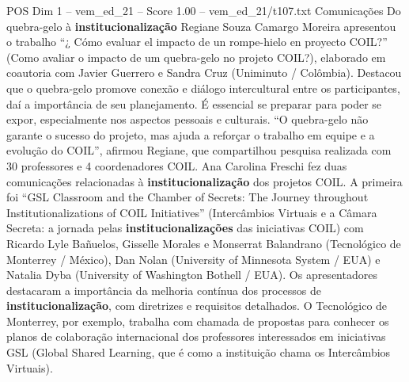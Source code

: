 \begin{textsample}{POS Dim 1 – vem\_ed\_21 – Score 1.00 – vem\_ed\_21/t107.txt}  \label{ex:f1_pos_037}
Comunicações Do quebra-gelo à \textbf{institucionalização} Regiane Souza Camargo Moreira apresentou o trabalho “¿ Cómo evaluar el impacto de un rompe-hielo en proyecto COIL?” (Como avaliar o impacto de um quebra-gelo no projeto COIL?), elaborado em coautoria com Javier Guerrero e Sandra Cruz (Uniminuto / Colômbia).
Destacou que o quebra-gelo promove conexão e diálogo intercultural entre os participantes, daí a importância de seu planejamento.
É essencial se preparar para poder se expor, especialmente nos aspectos pessoais e culturais. “O quebra-gelo não garante o sucesso do projeto, mas ajuda a reforçar o trabalho em equipe e a evolução do COIL”, afirmou Regiane, que compartilhou pesquisa realizada com 30 professores e 4 coordenadores COIL.
Ana Carolina Freschi fez duas comunicações relacionadas à \textbf{institucionalização} dos projetos COIL.
A primeira foi “GSL Classroom and the Chamber of Secrets: The Journey throughout Institutionalizations of COIL Initiatives” (Intercâmbios Virtuais e a Câmara Secreta: a jornada pelas \textbf{institucionalizações} das iniciativas COIL) com Ricardo Lyle Bañuelos, Gisselle Morales e Monserrat Balandrano (Tecnológico de Monterrey / México), Dan Nolan (University of Minnesota System / EUA) e Natalia Dyba (University of Washington Bothell / EUA).
Os apresentadores destacaram a importância da melhoria contínua dos processos de \textbf{institucionalização}, com diretrizes e requisitos detalhados.
O Tecnológico de Monterrey, por exemplo, trabalha com chamada de propostas para conhecer os planos de colaboração internacional dos professores interessados em iniciativas GSL (Global Shared Learning, que é como a instituição chama os Intercâmbios Virtuais).

\end{textsample}
